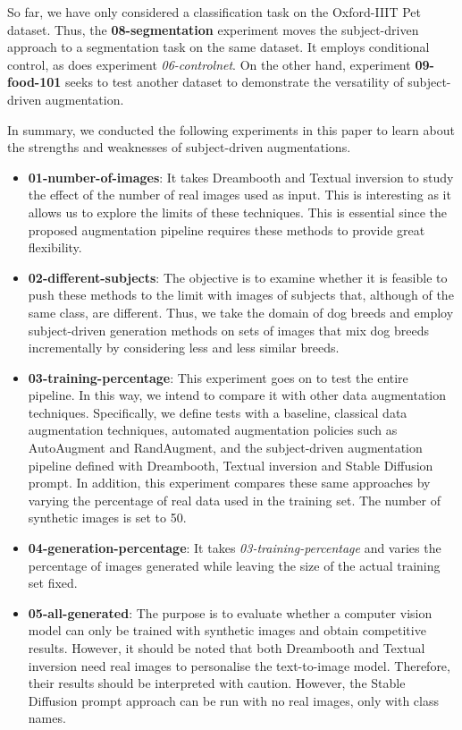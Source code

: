 So far, we have only considered a classification task on the Oxford-IIIT Pet dataset. Thus, the \textbf{08-segmentation} experiment moves the subject-driven approach to a segmentation task on the same dataset. It employs conditional control, as does experiment \textit{06-controlnet}. On the other hand, experiment \textbf{09-food-101} seeks to test another dataset to demonstrate the versatility of subject-driven augmentation.

In summary, we conducted the following experiments in this paper to learn about the strengths and weaknesses of subject-driven augmentations.

\begin{itemize}
    \item \textbf{01-number-of-images}: It takes Dreambooth and Textual inversion to study the effect of the number of real images used as input. This is interesting as it allows us to explore the limits of these techniques. This is essential since the proposed augmentation pipeline requires these methods to provide great flexibility.
    \item \textbf{02-different-subjects}: The objective is to examine whether it is feasible to push these methods to the limit with images of subjects that, although of the same class, are different. Thus, we take the domain of dog breeds and employ subject-driven generation methods on sets of images that mix dog breeds incrementally by considering less and less similar breeds.
    \item \textbf{03-training-percentage}: This experiment goes on to test the entire pipeline. In this way, we intend to compare it with other data augmentation techniques. Specifically, we define tests with a baseline, classical data augmentation techniques, automated augmentation policies such as AutoAugment and RandAugment, and the subject-driven augmentation pipeline defined with Dreambooth, Textual inversion and Stable Diffusion prompt. In addition, this experiment compares these same approaches by varying the percentage of real data used in the training set. The number of synthetic images is set to 50.
    \item \textbf{04-generation-percentage}: It takes \textit{03-training-percentage} and varies the percentage of images generated while leaving the size of the actual training set fixed.
    \item \textbf{05-all-generated}: The purpose is to evaluate whether a computer vision model can only be trained with synthetic images and obtain competitive results. However, it should be noted that both Dreambooth and Textual inversion need real images to personalise the text-to-image model. Therefore, their results should be interpreted with caution. However, the Stable Diffusion prompt approach can be run with no real images, only with class names.

\end{itemize}
